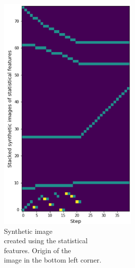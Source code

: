 \begin{minipage}{0.5\textwidth}
	\begin{figure}[H]
		\centering
		\includegraphics[width=6.8cm]{images/synImage.png}
		\caption[Synthetic image created using the statistical features. Origin of the image in the bottom left corner.]{Synthetic image\\\hspace{0\textwidth}created using the statistical\\\hspace{0\textwidth} features. Origin of the \\\hspace{0\textwidth}image in the bottom left corner.}
		\label{fig:synIm}
	\end{figure}
\end{minipage}

